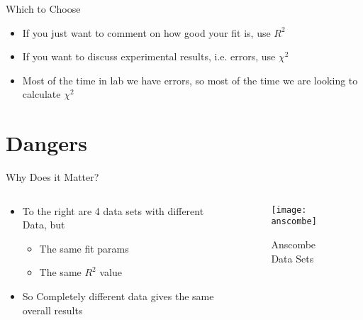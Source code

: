 \documentclass{beamer}
\begin{document}
\begin{frame}{Which to Choose}
  \begin{itemize}
  \item If you just want to comment on how good your fit is, use $R^2$
  \item If you want to discuss experimental results, i.e. errors, use $\chi^2$
  \item Most of the time in lab we have errors, so most of the time we are looking to calculate $\chi^2$
  \end{itemize}
\end{frame}

\section{Dangers}
\begin{frame}{Why Does it Matter?}
  \begin{columns}
    \begin{column}{0.5\textwidth}
      \begin{itemize}
      \item To the right are 4 data sets with different Data, but
        \begin{itemize}
        \item The same fit params
        \item The same $R^2$ value
        \end{itemize}
      \item So Completely different data gives the same overall results
      \end{itemize}
    \end{column}
    \begin{column}{0.5\textwidth}
      \begin{figure}[H]
        \centering
        \texttt{[image: anscombe]}
        \caption{Anscombe Data Sets}
      \end{figure}
    \end{column}
  \end{columns}
\end{frame}
\end{document}
